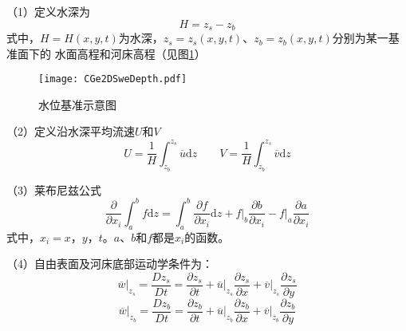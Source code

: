 （1）定义水深为
\begin{equation}
  H =  z_{s} - z_{b}
\end{equation}
式中，$H=H(x,y,t)$为水深，$ z_{s}= z_{s}(x,y,t)$、$z_{b}=z_{b}(x,y,t)$分别为某一基准面下的
水面高程和河床高程（见图\ref{FgCGe_2DSwe_depth}）

\begin{figure}[hb]
  \centering
  \texttt{[image: CGe2DSweDepth.pdf]}
  \caption{水位基准示意图}
  \label{FgCGe_2DSwe_depth}
\end{figure}

（2）定义沿水深平均流速$U$和$V$
\begin{equation}
  U
  =
  \frac{1}{H}
  \int_{z_{b}}^{ z_{s}}\!\overline{u}\mathrm{d}z
  \quad
  \quad
  V
  =
  \frac{1}{H}
  \int_{z_{b}}^{ z_{s}}\!\overline{v}\mathrm{d}z
\end{equation}

（3）莱布尼兹公式
\begin{equation}
  \frac{\partial}{\partial x_{i}}
  \int_{a}^{b}\!f\mathrm{d}z
  =
  \int_{a}^{b}\!
  \frac{\partial f}{\partial x_{i}}\mathrm{d}z
  +
  \left.
  f
  \right|_{b}\frac{\partial b}{\partial x_{i}}
  -
  \left.f\right|_{a}\frac{\partial a}{\partial x_{i}}
  \label{EqCGeLeibnizLaw}
\end{equation}
式中，$x_{i}=x$，$y$，$t$。$a$、$b$和$f$都是$x_{i}$的函数。

（4）自由表面及河床底部运动学条件为：
\begin{equation}
  \left.\overline{w}\right|_{z_{s}}
  =
  \frac{D z_{s}}{Dt}
  =
  \frac{\partial z_{s}}{\partial t}
  +
  \left.\overline{u}\right|_{z_{s}}\frac{\partial z_{s}}{\partial x}
  +
  \left.\overline{v}\right|_{z_{s}}\frac{\partial z_{s}}{\partial y}
  \label{EqCGeSMC}
\end{equation}
\begin{equation}
  \left.\overline{w}\right|_{z_{b}}
  =
  \frac{Dz_{b}}{Dt}
  =
  \frac{\partial z_{b}}{\partial t}
  +
  \left.\overline{u}\right|_{z_{b}}\frac{\partial z_{b}}{\partial x}
  +
  \left.\overline{v}\right|_{z_{b}}\frac{\partial z_{b}}{\partial y}
  \label{EqCGeBMC}
\end{equation}

